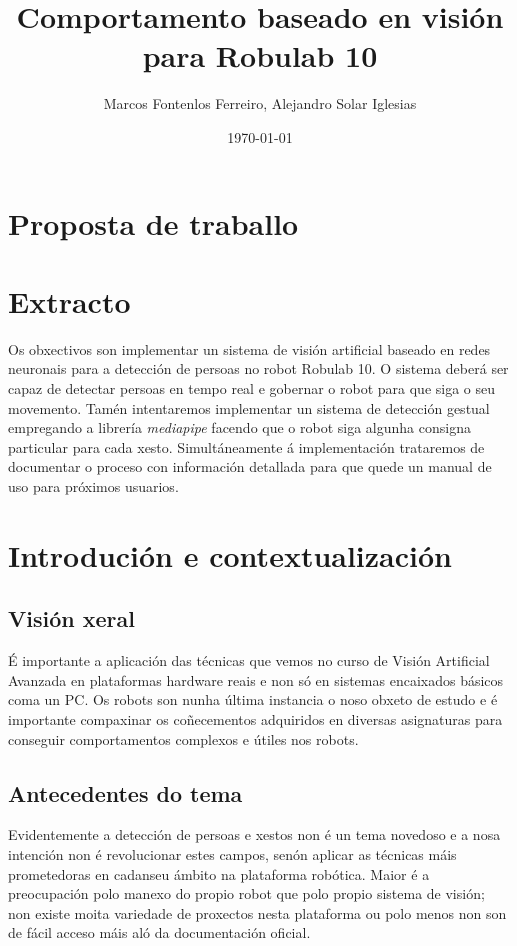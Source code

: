 \documentclass{article}
\title{Comportamento baseado en visión para Robulab 10}
\author{Marcos Fontenlos Ferreiro, Alejandro Solar Iglesias}
\date{\today}
\begin{document}
\maketitle

\section*{Proposta de traballo}

\section{Extracto}

Os obxectivos son implementar un sistema de visión artificial baseado en redes neuronais para a detección de persoas no robot Robulab 10.
O sistema deberá ser capaz de detectar persoas en tempo real e gobernar o robot para que siga o seu movemento. Tamén intentaremos implementar un sistema 
de detección gestual empregando a librería \textit{mediapipe} facendo que o robot siga algunha consigna particular para cada xesto. Simultáneamente á implementación 
trataremos de documentar o proceso con información detallada para que quede un manual de uso para próximos usuarios.

\section{Introdución e contextualización}

\subsection{Visión xeral}

É importante a aplicación das técnicas que vemos no curso de Visión Artificial Avanzada en plataformas hardware reais e non só en sistemas encaixados básicos coma un PC.
Os robots son nunha última instancia o noso obxeto de estudo e é importante compaxinar os coñecementos adquiridos en diversas asignaturas para conseguir 
comportamentos complexos e útiles nos robots. 

\subsection{Antecedentes do tema}

Evidentemente a detección de persoas e xestos non é un tema novedoso e a nosa intención non é revolucionar estes campos, senón aplicar as técnicas máis prometedoras 
en cadanseu ámbito na plataforma robótica. Maior é a preocupación polo manexo do propio robot que polo propio sistema de visión; non existe moita variedade de proxectos nesta plataforma 
ou polo menos non son de fácil acceso máis aló da documentación oficial.
\end{document}
